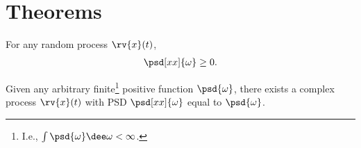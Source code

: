 \section{Theorems}
\begin{theoremBox}
     For any random process $\rv{x}(t)$, 
     \begin{align}
         \psd[xx]{\omega}\geq 0.
     \end{align}
\end{theoremBox}

\begin{theoremBox}
     Given any arbitrary finite\footnote{I.e., $\int\psd{\omega}\dee\omega<\infty$.} positive function $\psd{\omega}$, there exists a complex process $\rv{x}(t)$ with PSD $\psd[xx]{\omega}$ equal to $\psd{\omega}$.
\end{theoremBox}


